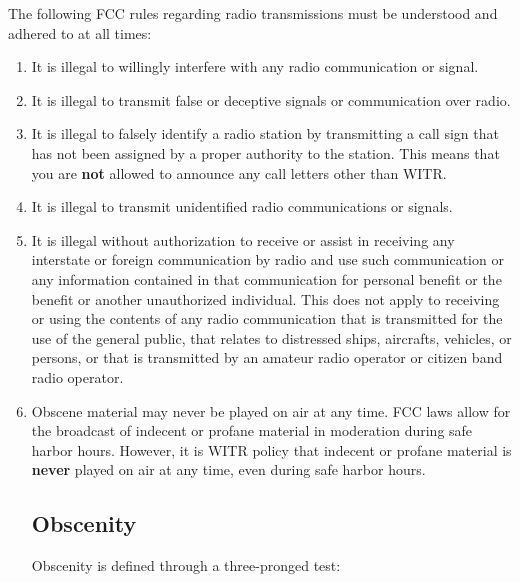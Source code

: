 \documentclass{witrman}
\begin{document}
The following FCC rules regarding radio transmissions must be understood and
adhered to at all times:
\begin{enumerate}
    \item It is illegal to willingly interfere with any radio communication or
        signal.
    \item It is illegal to transmit false or deceptive signals or communication
        over radio.
    \item It is illegal to falsely identify a radio station by transmitting a
        call sign that has not been assigned by a proper authority to the
        station. This means that you are \textbf{not} allowed to announce any
        call letters other than WITR\@.
    \item It is illegal to transmit unidentified radio communications or
        signals.
    \item It is illegal without authorization to receive or assist in receiving
        any interstate or foreign communication by radio and use such
        communication or any information contained in that communication for
        personal benefit or the benefit or another unauthorized individual. This
        does not apply to receiving or using the contents of any radio
        communication that is transmitted for the use of the general public,
        that relates to distressed ships, aircrafts, vehicles, or persons, or
        that is transmitted by an amateur radio operator or citizen band radio
        operator.
    \item Obscene material may never be played on air at any time. FCC laws
        allow for the broadcast of indecent or profane material in moderation
        during safe harbor hours. However, it is WITR policy that indecent or
        profane material is \textbf{never} played on air at any time, even
        during safe harbor hours.

        \subsection{Obscenity}
        Obscenity is defined through a three-pronged test:


\end{enumerate}
\end{document}
